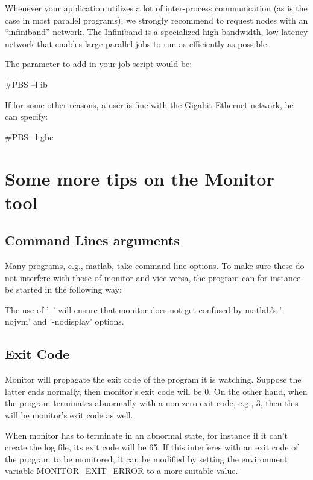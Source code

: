Whenever your application utilizes a lot of inter-process communication (as is the case in most parallel programs), we strongly recommend to request nodes with an ``infiniband'' network. The Infiniband is a specialized high bandwidth, low latency network that enables large parallel jobs to run as efficiently as possible.

The parameter to add in your job-script would be:
\begin{prog}
\#PBS --l ib
\end{prog}

If for some other reasons, a user is fine with the Gigabit Ethernet network, he can specify:
\begin{prog}
\#PBS --l gbe
\end{prog}

\section{Some more tips on the Monitor tool}

\subsection{Command Lines arguments}

Many programs, e.g., matlab, take command line options. To make sure these do not interfere with those of monitor and vice versa, the program can for instance be started in the following way:
\begin{prompt}
$ %
\end{prompt}

The use of '--' will ensure that monitor does not get confused by matlab's '-nojvm' and '-nodisplay' options.

\subsection{Exit Code}

Monitor will propagate the exit code of the program it is watching. Suppose the latter ends normally, then monitor's exit code will be 0. On the other hand, when the program terminates abnormally with a non-zero exit code, e.g., 3, then this will be monitor's exit code as well.

When monitor has to terminate in an abnormal state, for instance if it can't create the log file, its exit code will be 65. If this interferes with an exit code of the program to be monitored, it can be modified by setting the environment variable MONITOR\_EXIT\_ERROR to a more suitable value.

